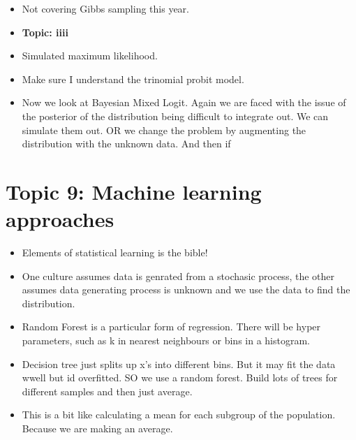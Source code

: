 \documentclass[12pt]{article}
\begin{document}
\begin{itemize}
      \item Not covering Gibbs sampling this year.
      \item \textbf{Topic: iiii}
      \item Simulated maximum likelihood.
      \item Make sure I understand the trinomial probit model.
      \item Now we look at Bayesian Mixed Logit. Again we are faced with the issue of the posterior of the distribution
            being difficult to integrate out. We can simulate them out. OR we change the problem by augmenting the distribution
            with the unknown data. And then if

\end{itemize}

\section*{Topic 9: Machine learning approaches}
\begin{itemize}
      \item Elements of statistical learning is the bible!
      \item One culture assumes data is genrated from a stochasic process, the other assumes data generating process is
            unknown and we use the data to find the distribution.

      \item Random Forest is a particular form of regression. There will be hyper parameters, such as k in nearest neighbours
            or bins in a histogram.

      \item Decision tree just splits up x's into different bins. But it may fit the data wwell but id overfitted.
            SO we use a random forest. Build lots of trees for different samples and then just average.

      \item This is a bit like calculating a mean for each subgroup of the population. Because we are making
            an average.
\end{itemize}
\end{document}
